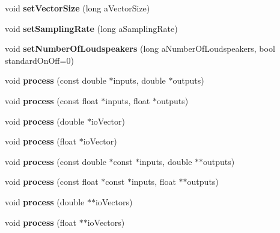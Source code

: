\begin{DoxyCompactItemize}
\item 
\hypertarget{class_ambisonic_space_a7dd6c1c36388986611596163cd0ec733}{void {\bfseries set\-Vector\-Size} (long a\-Vector\-Size)}\label{class_ambisonic_space_a7dd6c1c36388986611596163cd0ec733}

\item 
\hypertarget{class_ambisonic_space_aaee75c804b66e825418ceb0c48e27381}{void {\bfseries set\-Sampling\-Rate} (long a\-Sampling\-Rate)}\label{class_ambisonic_space_aaee75c804b66e825418ceb0c48e27381}

\item 
\hypertarget{class_ambisonic_space_a4e2eb2a2c3ac8bb61495eac9eb3abfde}{void {\bfseries set\-Number\-Of\-Loudspeakers} (long a\-Number\-Of\-Loudspeakers, bool standard\-On\-Off=0)}\label{class_ambisonic_space_a4e2eb2a2c3ac8bb61495eac9eb3abfde}

\item 
\hypertarget{class_ambisonic_space_a88d51fd835645f4f8022e0aefe10bba3}{void {\bfseries process} (const double $\ast$inputs, double $\ast$outputs)}\label{class_ambisonic_space_a88d51fd835645f4f8022e0aefe10bba3}

\item 
\hypertarget{class_ambisonic_space_a248fa89187126c1e1418dc226a10bfb3}{void {\bfseries process} (const float $\ast$inputs, float $\ast$outputs)}\label{class_ambisonic_space_a248fa89187126c1e1418dc226a10bfb3}

\item 
\hypertarget{class_ambisonic_space_a24e370a2161059c11a89771379e38f36}{void {\bfseries process} (double $\ast$io\-Vector)}\label{class_ambisonic_space_a24e370a2161059c11a89771379e38f36}

\item 
\hypertarget{class_ambisonic_space_a94edbc488961063d9ee2927d308df2ea}{void {\bfseries process} (float $\ast$io\-Vector)}\label{class_ambisonic_space_a94edbc488961063d9ee2927d308df2ea}

\item 
\hypertarget{class_ambisonic_space_a28eab2ca744e0a172c17276c0b4b18a1}{void {\bfseries process} (const double $\ast$const $\ast$inputs, double $\ast$$\ast$outputs)}\label{class_ambisonic_space_a28eab2ca744e0a172c17276c0b4b18a1}

\item 
\hypertarget{class_ambisonic_space_ad29fd8d27c7412e20c708b0f00e0a37c}{void {\bfseries process} (const float $\ast$const $\ast$inputs, float $\ast$$\ast$outputs)}\label{class_ambisonic_space_ad29fd8d27c7412e20c708b0f00e0a37c}

\item 
\hypertarget{class_ambisonic_space_aefeb1c2988d73d16de4ee1403f4d566a}{void {\bfseries process} (double $\ast$$\ast$io\-Vectors)}\label{class_ambisonic_space_aefeb1c2988d73d16de4ee1403f4d566a}

\item 
\hypertarget{class_ambisonic_space_a1e5ce921410a6e086ff1a3ce98288f2c}{void {\bfseries process} (float $\ast$$\ast$io\-Vectors)}\label{class_ambisonic_space_a1e5ce921410a6e086ff1a3ce98288f2c}

\end{DoxyCompactItemize}
